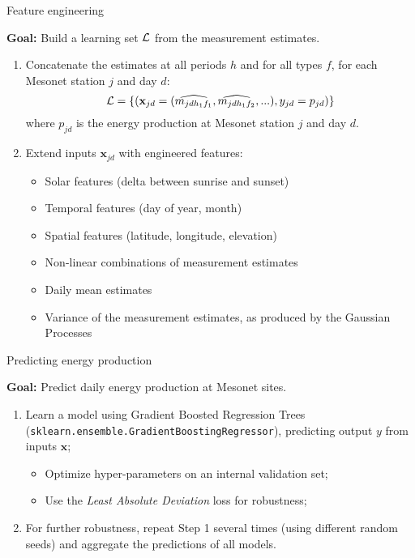 \documentclass[handout]{beamer}
\begin{document}
\begin{frame}{Feature engineering}

\textbf{Goal:} Build a learning set ${\cal L}$ from the measurement estimates.

\begin{enumerate}

\item Concatenate the estimates at all periods $h$ and for all types $f$, for
each Mesonet station $j$ and day $d$:
$${\cal L} = \{ (\mathbf{x}_{jd} = (\widehat{m_{jd{h_1}{f_1}}}, \widehat{m_{jd{h_1}{f_2}}}, ...), y_{jd} = p_{jd}) \}$$
where $p_{jd}$ is the energy production at Mesonet station $j$ and day $d$.

\item Extend inputs $\mathbf{x}_{jd}$ with engineered features:
\begin{itemize}
\item Solar features (delta between sunrise and sunset)
\item Temporal features (day of year, month)
\item Spatial features (latitude, longitude, elevation)
\item Non-linear combinations of measurement estimates
\item Daily mean estimates
\item Variance of the measurement estimates, as produced by the Gaussian Processes
\end{itemize}

\end{enumerate}

\end{frame}



\begin{frame}{Predicting energy production}

\textbf{Goal:} Predict daily energy production at Mesonet sites.

\begin{enumerate}
\item Learn a model using Gradient Boosted Regression Trees (\texttt{sklearn.ensemble.GradientBoostingRegressor}), predicting output $y$ from inputs $\mathbf{x}$;
    \begin{itemize}
        \item Optimize hyper-parameters on an internal validation set;
        \item Use the \textit{Least Absolute Deviation} loss for robustness;
    \end{itemize}
\item For further robustness, repeat Step 1 several times (using different random seeds) and aggregate the predictions of all models.
\end{enumerate}

\end{frame}
\end{document}
